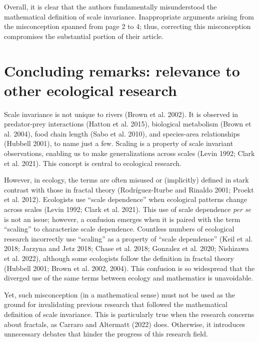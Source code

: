 \documentclass[
  12pt,
]{article}
\begin{document}
Overall, it is clear that the authors fundamentally misunderstood the mathematical definition of scale invariance. Inappropriate arguments arising from the misconception spanned from page 2 to 4; thus, correcting this misconception compromises the substantial portion of their article.

\hypertarget{concluding-remarks-relevance-to-other-ecological-research}{%
\section{Concluding remarks: relevance to other ecological research}\label{concluding-remarks-relevance-to-other-ecological-research}}

Scale invariance is not unique to rivers (Brown et al. 2002). It is observed in predator-prey interactions (Hatton et al. 2015), biological metabolism (Brown et al. 2004), food chain length (Sabo et al. 2010), and species-area relationships (Hubbell 2001), to name just a few. Scaling is a property of scale invariant observations, enabling us to make generalizations across scales (Levin 1992; Clark et al. 2021). This concept is central to ecological research.

However, in ecology, the terms are often misused or (implicitly) defined in stark contrast with those in fractal theory (Rodríguez-Iturbe and Rinaldo 2001; Proekt et al. 2012). Ecologists use ``scale dependence'' when ecological patterns change across scales (Levin 1992; Clark et al. 2021). This use of scale dependence \emph{per se} is not an issue; however, a confusion emerges when it is paired with the term ``scaling'' to characterize scale dependence. Countless numbers of ecological research incorrectly use ``scaling'' as a property of ``scale dependence'' (Keil et al. 2018; Jarzyna and Jetz 2018; Chase et al. 2018; Gonzalez et al. 2020; Nishizawa et al. 2022), although some ecologists follow the definition in fractal theory (Hubbell 2001; Brown et al. 2002, 2004). This confusion is so widespread that the diverged use of the same terms between ecology and mathematics is unavoidable.

Yet, such misconception (in a mathematical sense) must not be used as the ground for invalidating previous research that followed the mathematical definition of scale invariance. This is particularly true when the research concerns about fractals, as Carraro and Altermatt (2022) does. Otherwise, it introduces unnecessary debates that hinder the progress of this research field.
\end{document}

